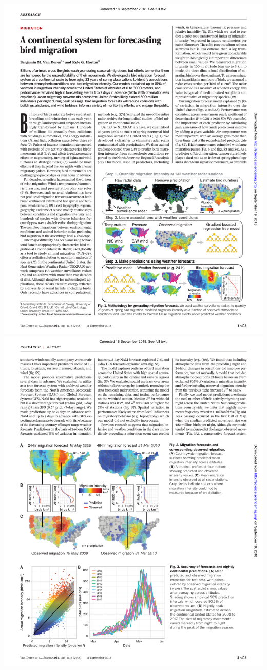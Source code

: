 \documentclass[a4paper, twoside]{templates/ociamthesis}
\begin{document}
\includegraphics[width=1\linewidth]{pdf_chapters/forecast/forecast_crop_Part1}
\includegraphics[width=1\linewidth]{pdf_chapters/forecast/forecast_crop_Part2}
\end{document}
